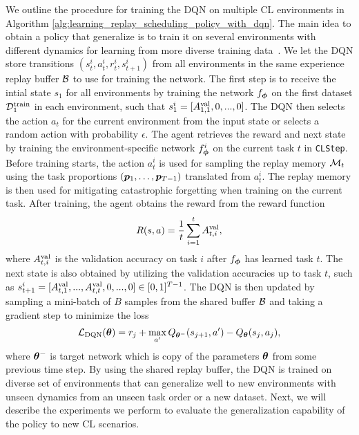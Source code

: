 We outline the procedure for training the DQN on multiple CL environments in Algorithm \ref{alg:learning_replay_scheduling_policy_with_dqn}. The main idea to obtain a policy that generalize is to train it on several environments with different dynamics for learning from more diverse training data~\cite{zhang2018dissection}. We let the DQN store transitions $(s_{t}^{i}, a_{t}^{i}, r_{t}^{i}, s_{t+1}^{i})$ from all environments in the same experience replay buffer ${\mathcal{B}}$ to use for training the network. The first step is to receive the intial state $s_1$ for all environments by training the network $f_{{\bm{\phi}}}$ on the first dataset ${\mathcal{D}}_1^{{\text{train}}}$ in each environment, such that $s_{1}^{i} = [A_{1,1}^{{\text{val}}}, 0, ..., 0]$. The DQN then selects the action $a_t$ for the current environment from the input state or selects a random action with probability $\epsilon$. The agent retrieves the reward and next state by training the environment-specific network $f_{{\bm{\phi}}}^{i}$ on the current task $t$ in \texttt{CLStep}. Before training starts, the action $a_{t}^{i}$ is used for sampling the replay memory ${\mathcal{M}}_t$ using the task proportions $({\bm{p}}_1, \dots, {\bm{p}}_{T-1})$ translated from $a_{t}^{i}$. The replay memory is then used for mitigating catastrophic forgetting when training on the current task. After training, the agent obtains the reward from the reward function 
\begin{align}
	R(s, a) = \frac{1}{t} \sum_{i=1}^{t} A_{t, i}^{{\text{val}}},
\end{align}
where $A_{t, i}^{{\text{val}}}$ is the validation accuracy on task $i$ after $f_{{\bm{\phi}}}$ has learned task $t$. The next state is also obtained by utilizing the validation accuracies up to task $t$, such as $s_{t+1}^{i} = [A_{t, 1}^{{\text{val}}}, ..., A_{t, t}^{{\text{val}}}, 0, ..., 0] \in [0, 1]^{T-1}$. The DQN is then updated by sampling a mini-batch of $B$ samples from the shared buffer ${\mathcal{B}}$ and taking a gradient step to minimize the loss
\begin{align}
	{\mathcal{L}}_{\text{DQN}}({\bm{\theta}}) = r_j + \max_{a'} Q_{{\bm{\theta}}^{-}}(s_{j+1}, a') - Q_{{\bm{\theta}}}(s_j, a_j), 
\end{align}  
where ${\bm{\theta}}^{-}$ is target network which is copy of the parameters ${\bm{\theta}}$ from some previous time step. By using the shared replay buffer, the DQN is trained on diverse set of environments that can generalize well to new environments with unseen dynamics from an unseen task order or a new dataset. Next, we will describe the experiments we perform to evaluate the generalization capability of the policy to new CL scenarios. 



